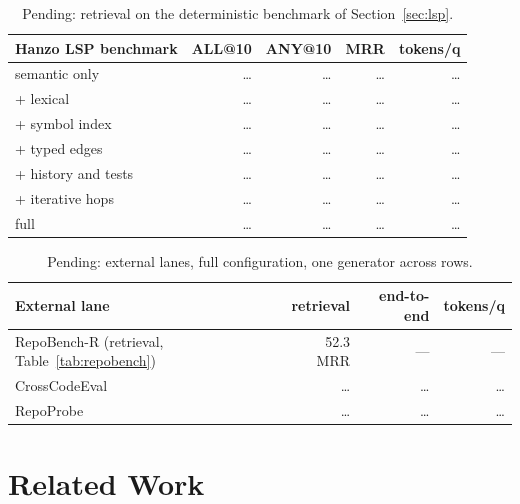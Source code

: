 \documentclass[11pt]{article}
\begin{document}
\begin{table}[t]
\centering
\footnotesize

\caption{RepoBench-R Python, test split, retrieval only, one row per
configuration. R@$k$ is whether the gold snippet is in the top $k$ of about
twelve candidates; \emph{hard} is the benchmark's own level. Weights frozen
on dev; test run once.}
\label{tab:repobench}
\end{table}

\begin{table}[t]
\centering
\small
\begin{tabular}{lrrrr}
\toprule
Hanzo LSP benchmark & ALL@10 & ANY@10 & MRR & tokens/q \\
\midrule
semantic only & \ldots & \ldots & \ldots & \ldots \\ %
+ lexical & \ldots & \ldots & \ldots & \ldots \\
+ symbol index & \ldots & \ldots & \ldots & \ldots \\
+ typed edges & \ldots & \ldots & \ldots & \ldots \\
+ history and tests & \ldots & \ldots & \ldots & \ldots \\
+ iterative hops & \ldots & \ldots & \ldots & \ldots \\
full & \ldots & \ldots & \ldots & \ldots \\
\bottomrule
\end{tabular}
\caption{Pending: retrieval on the deterministic benchmark of
Section~\ref{sec:lsp}.}
\end{table}

\begin{table}[t]
\centering
\small
\begin{tabular}{lrrr}
\toprule
External lane & retrieval & end-to-end & tokens/q \\
\midrule
RepoBench-R (retrieval, Table~\ref{tab:repobench}) & 52.3 MRR & --- & --- \\
CrossCodeEval & \ldots & \ldots & \ldots \\ %
RepoProbe & \ldots & \ldots & \ldots \\ %
\bottomrule
\end{tabular}
\caption{Pending: external lanes, full configuration, one generator across rows.}
\end{table}

\section{Related Work}
\end{document}
